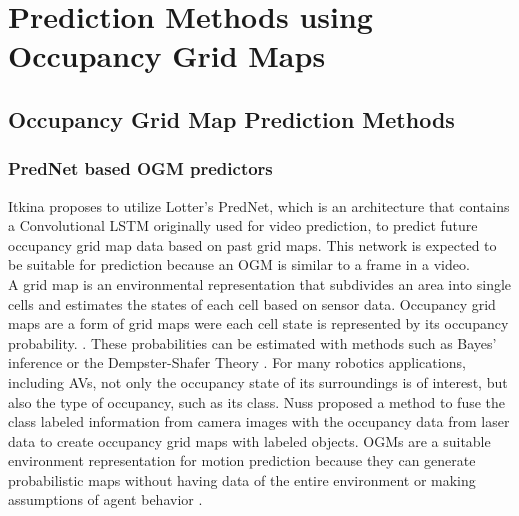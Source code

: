 \section{Prediction Methods using Occupancy Grid Maps} \label{sec:ogm_methods}

\subsection{Occupancy Grid Map Prediction Methods} 

\subsubsection{PredNet based OGM predictors}

Itkina \cite{itkina2019dynamic} proposes to utilize Lotter's \cite{lotter2016deep} PredNet, which is an architecture that contains a Convolutional LSTM originally used for video prediction, to predict future occupancy grid map data based on past grid maps. This network is expected to be suitable for  prediction because an \gls{OGM} is similar to a frame in a video. \\


A grid map is an environmental representation that subdivides an area into single cells and estimates the states of each cell based on sensor data. Occupancy grid maps are a form of grid maps were each cell state is represented by its occupancy probability. \cite{nuss2014fusion}. These probabilities can be estimated with methods such as Bayes' inference or the Dempster-Shafer Theory \cite{dempster1968generalization}. For many robotics applications, including AVs, not only the occupancy state of its surroundings is of interest, but also the type of occupancy, such as its class. Nuss \cite{nuss2014fusion} proposed a method to fuse the class labeled information from camera images with the occupancy data from laser data to create occupancy grid maps with labeled objects.    
OGMs are a suitable environment representation for motion prediction because they can generate probabilistic maps without having data of the entire environment or making assumptions of agent behavior \cite{itkina2019dynamic}. \\

